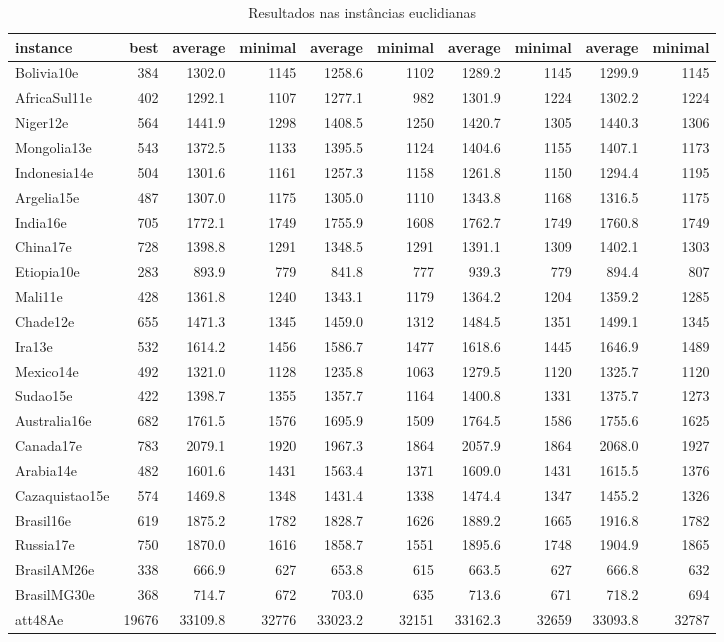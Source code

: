 \begin{landscape}
\begin{table}[htb]

\caption{Resultados nas instâncias euclidianas}
\label{tab:resultadosEuclidianas}
\begin{tabular}{@{}lrrrrrrrrr@{}}
\toprule
instance&best&average&minimal&average&minimal&average&minimal&average&minimal\\\midrule
Bolivia10e&384&1302.0&1145&1258.6&1102&1289.2&1145&1299.9&1145\\
AfricaSul11e&402&1292.1&1107&1277.1&982&1301.9&1224&1302.2&1224\\
Niger12e&564&1441.9&1298&1408.5&1250&1420.7&1305&1440.3&1306\\
Mongolia13e&543&1372.5&1133&1395.5&1124&1404.6&1155&1407.1&1173\\
Indonesia14e&504&1301.6&1161&1257.3&1158&1261.8&1150&1294.4&1195\\
Argelia15e&487&1307.0&1175&1305.0&1110&1343.8&1168&1316.5&1175\\
India16e&705&1772.1&1749&1755.9&1608&1762.7&1749&1760.8&1749\\
China17e&728&1398.8&1291&1348.5&1291&1391.1&1309&1402.1&1303\\
Etiopia10e&283&893.9&779&841.8&777&939.3&779&894.4&807\\
Mali11e&428&1361.8&1240&1343.1&1179&1364.2&1204&1359.2&1285\\
Chade12e&655&1471.3&1345&1459.0&1312&1484.5&1351&1499.1&1345\\
Ira13e&532&1614.2&1456&1586.7&1477&1618.6&1445&1646.9&1489\\
Mexico14e&492&1321.0&1128&1235.8&1063&1279.5&1120&1325.7&1120\\
Sudao15e&422&1398.7&1355&1357.7&1164&1400.8&1331&1375.7&1273\\
Australia16e&682&1761.5&1576&1695.9&1509&1764.5&1586&1755.6&1625\\
Canada17e&783&2079.1&1920&1967.3&1864&2057.9&1864&2068.0&1927\\
Arabia14e&482&1601.6&1431&1563.4&1371&1609.0&1431&1615.5&1376\\
Cazaquistao15e&574&1469.8&1348&1431.4&1338&1474.4&1347&1455.2&1326\\
Brasil16e&619&1875.2&1782&1828.7&1626&1889.2&1665&1916.8&1782\\
Russia17e&750&1870.0&1616&1858.7&1551&1895.6&1748&1904.9&1865\\
BrasilAM26e&338&666.9&627&653.8&615&663.5&627&666.8&632\\
BrasilMG30e&368&714.7&672&703.0&635&713.6&671&718.2&694\\
att48Ae&19676&33109.8&32776&33023.2&32151&33162.3&32659&33093.8&32787\\
\bottomrule
\end{tabular}
\end{table}
\end{landscape}
